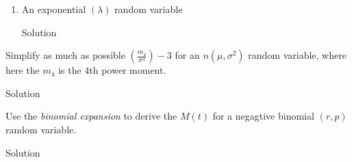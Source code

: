 \documentclass{article}
\begin{document}
\begin{spacing}{1.1}
\begin{homeworkProblem}
\begin{enumerate}[(1)]
\begin{homeworkSection}{Solution}
\begin{align*}
  | The derivative of p is zero:
= | (n - 1) n p^2 (e^{2 t}  (p e^t - p+1)^{n - 2}  (\frac{ d}{ dt} (2 t)) + (n - 2) e^{2 t}  (p e^t - 0) (p e^t - p+1)^{n - 3} ) + n p ((n - 1) e^t (p e^t - p+1)^{n - 2}  (p e^t - \frac{ d}{ dt} (p)) + e^t (p e^t - p+1)^{n - 1} )
  | The derivative of p is zero:
= | (n - 1) n p^2 (e^{2 t}  (p e^t - p+1)^{n - 2}  (\frac{ d}{ dt} (2 t)) + (n - 2) p e^{3 t}  (p e^t - p+1)^{n - 3} ) + n p ((n - 1) e^t (p e^t - 0) (p e^t - p+1)^{n - 2}  + e^t (p e^t - p+1)^{n - 1} )
  | Factor out constants:
= | (n - 1) n p^2 (e^{2 t}  (p e^t - p+1)^{n - 2}  (2 (\frac{ d}{ dt} (t))) + (n - 2) p e^{3 t}  (p e^t - p+1)^{n - 3} ) + n p ((n - 1) p e^{2 t}  (p e^t - p+1)^{n - 2}  + e^t (p e^t - p+1)^{n - 1} )
  | The derivative of t is 1:
= | (n - 1) n p^2 ((n - 2) p e^{3 t}  (p e^t - p+1)^{n - 3}  + 2 e^{2 t}  (p e^t - p+1)^{n - 2} ) + n p ((n - 1) p e^{2 t}  (p e^t - p+1)^{n - 2}  + e^t (p e^t - p+1)^{n - 1} )
            &= n p e^t (p (e^t  -  1)  +  1)^{n  -  3} (p^2 (n^2 e^2t  +  (1  -  3 n) e^t  +  1) 
             +  p ((3n  -  1) e^t  - 2)  +  1)\\
          \text{Hence}\\
          M'''(0) &=
      \end{align*}
      \end{homeworkSection}
    \item An exponential $(\lambda)$ random variable
      \begin{homeworkSection}{Solution}
        
      \end{homeworkSection}
  \end{enumerate}
\end{homeworkProblem}

\newpage
\begin{homeworkProblem}
  Simplify as much as possible $\left(\frac{ m_4}{ \sigma^4}\right) - 3$ 
  for an $n(\mu, \sigma^2)$ random variable, where here the $m_4$ is the
  4th power moment.
  \begin{homeworkSection}{Solution}
    
  \end{homeworkSection}
\end{homeworkProblem}

\newpage
\begin{homeworkProblem}
  Use the \emph{binomial expansion} to derive the $M(t)$ for a negagtive
  binomial $(r, p)$ random variable.
  \begin{homeworkSection}{Solution}
    

\end{homeworkSection}
\end{homeworkProblem}
\end{spacing}
\end{document}
